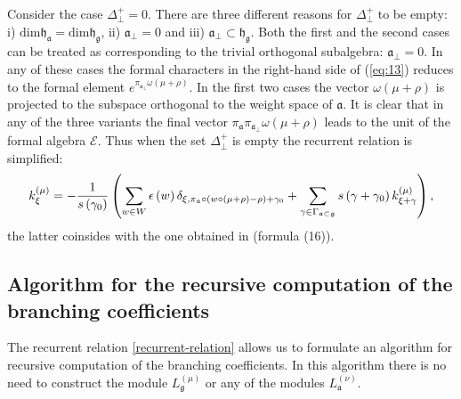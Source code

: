 \documentclass[a4paper,12pt]{article}
\theoremstyle{definition} \newtheorem{Def}{Definition}
\begin{document}
Consider the case  $\Delta_{\bot}^{+} = 0$. There are three different reasons for $\Delta_{\bot}^{+}$ to be empty: i) $\mathrm{dim}\mathfrak{h}_{\mathfrak{a}}=\mathrm{dim}\mathfrak{h}_{\mathfrak{g}}$, ii) $\mathfrak{a}_{\bot}=0$ and iii) $\mathfrak{a}_{\bot}\subset \mathfrak{h}_{\mathfrak{g}}$. Both the first and the second cases can be treated as corresponding to the trivial orthogonal subalgebra:
$\mathfrak{a}_{\bot}=0$. In any of these cases the formal characters in the right-hand side of (\ref{eq:13}) reduces to the formal element $e^{ \pi_{\mathfrak{a}_{\bot}}\omega(\mu+\rho)}$.
In the first two cases the vector $\omega(\mu+\rho)$ is projected to the subspace orthogonal to the weight space of $\mathfrak{a}$. It is clear that in any of the three variants the final vector $\pi_{\mathfrak{a}}\pi_{\mathfrak{a}_{\bot}}\omega(\mu+\rho)$ leads to the unit of the formal algebra
$\mathcal{E}$. Thus when the set $\Delta_{\bot}^{+}$ is empty the  recurrent relation is simplified:
\begin{equation}
k_{\xi }^{\left( \mu \right) }=-\frac{1}{s\left( \gamma _{0}\right) }\left(
\sum_{w\in W}\epsilon \left( w\right) \delta _{\xi ,\pi _{\frak{a}}\circ
\left( w\circ (\mu +\rho )-\rho \right) +\gamma _{0}}+\sum_{\gamma \in
\Gamma _{\frak{a}\subset \frak{g}}}s\left( \gamma +\gamma _{0}\right) k_{\xi
+\gamma }^{\left( \mu \right) }\right),  \label{recurrent relation special}
\end{equation}
the latter coinsides with the one obtained in \cite{ilyin812pbc} (formula (16)).

\subsection{Algorithm for the recursive computation of the branching coefficients}
\label{sec:algorithm}

The recurrent relation \eqref{recurrent-relation} allows us to formulate an algorithm for recursive computation of the branching coefficients. In this algorithm there is no need to  construct the module $L^{(\mu)}_{\mathfrak{g}}$ or any of the modules $L^{(\nu)}_{\mathfrak{a}}$.
\end{document}
